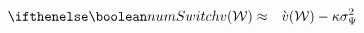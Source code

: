\begin{eqnarray}
\ifnumSw  v(\W) & \approx & \grave{v}(\W) - \kappa \sigma^{2}_{\Psi} \label{eq:vApprox}
\end{eqnarray}
